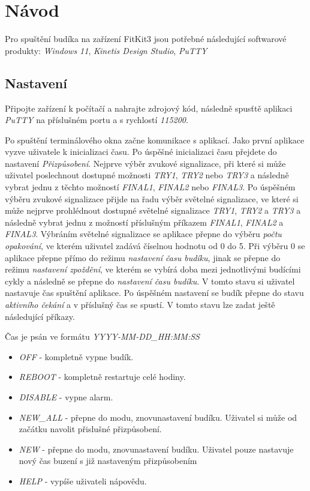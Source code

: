 \documentclass[a4paper, 11pt]{article}
\begin{document}
    \section{Návod}
    Pro spuštění budíka na zařízení FitKit3 jsou potřebné následující softwarové produkty: \textit{Windows 11}, \textit{Kinetis Design Studio}, \textit{PuTTY}

    \subsection{Nastavení}
    Připojte zařízení k počítačí a nahrajte zdrojový kód, následně spusťtě aplikaci \textit{PuTTY} na příslušném portu a s rychlostí \textit{115200}. 

    Po spuštění terminálového okna začne komunikace s aplikací. Jako první aplikace vyzve uživatele k inicializaci času. Po úspěšné inicializaci času přejdete do nastavení \textit{Přizpůsobení}. Nejprve výběr zvukové signalizace, při které si může uživatel poslechnout dostupné možnosti \textit{TRY1}, \textit{TRY2} nebo \textit{TRY3} a následně vybrat jednu z těchto možností \textit{FINAL1}, \textit{FINAL2} nebo \textit{FINAL3}. Po úspěšném výběru zvukové signalizace přijde na řadu výběr světelné signalizace, ve které si může nejprve prohlédnout dostupné světelné signalizace \textit{TRY1}, \textit{TRY2} a \textit{TRY3} a následně vybrat jednu z možností příslušným příkazem \textit{FINAL1}, \textit{FINAL2} a \textit{FINAL3}. Výbráním světelné signalizace se aplikace přepne do výběru \textit{počtu opakování}, ve kterém uživatel zadává číselnou hodnotu od 0 do 5. Při výběru 0 se aplikace přepne přímo do režimu \textit{nastavení času budíku}, jinak se přepne do režimu \textit{nastavení zpoždění}, ve kterém se vybírá doba mezi jednotlivými budícími cykly a následně se přepne do \textit{nastavení času budíku}. V tomto stavu si uživatel nastavuje čas spuštění aplikace. Po úspěšném nastavení se budík přepne do stavu \textit{aktivního čekání} a v příslušný čas se spustí. V tomto stavu lze zadat ještě následující příkazy.

    Čas je psán ve formátu \textit{YYYY-MM-DD\_HH:MM:SS} 

    \begin{itemize}
        \item \textit{OFF} - kompletně vypne budík.
        \item \textit{REBOOT} - kompletně restartuje celé hodiny.
        \item \textit{DISABLE} - vypne alarm.
        \item \textit{NEW\_ALL} - přepne do modu, znovunastavení budíku. Uživatel si může od začátku navolit přislušné přizpůsobení.
        \item \textit{NEW} - přepne do modu, znovunastavení budíku. Uživatel pouze nastavuje nový čas buzení s již nastaveným přizpůsobením
        \item \textit{HELP} - vypíše uživateli nápovědu.
        
    \end{itemize}
\end{document}

